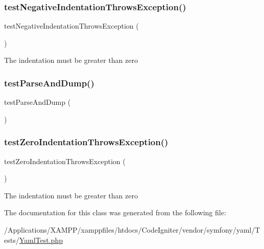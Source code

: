 \subsubsection{\texorpdfstring{test\+Negative\+Indentation\+Throws\+Exception()}{testNegativeIndentationThrowsException()}}
{\footnotesize\ttfamily test\+Negative\+Indentation\+Throws\+Exception (\begin{DoxyParamCaption}{ }\end{DoxyParamCaption})}

The indentation must be greater than zero \mbox{\label{class_symfony_1_1_component_1_1_yaml_1_1_tests_1_1_yaml_test_aa4b0f9bbd68ce5dfd5762103d00c7e23}} 
\subsubsection{\texorpdfstring{test\+Parse\+And\+Dump()}{testParseAndDump()}}
{\footnotesize\ttfamily test\+Parse\+And\+Dump (\begin{DoxyParamCaption}{ }\end{DoxyParamCaption})}

\mbox{\label{class_symfony_1_1_component_1_1_yaml_1_1_tests_1_1_yaml_test_abd2a07951f38494a1fe3e2374ffd04de}} 
\subsubsection{\texorpdfstring{test\+Zero\+Indentation\+Throws\+Exception()}{testZeroIndentationThrowsException()}}
{\footnotesize\ttfamily test\+Zero\+Indentation\+Throws\+Exception (\begin{DoxyParamCaption}{ }\end{DoxyParamCaption})}

The indentation must be greater than zero 

The documentation for this class was generated from the following file\+:\begin{DoxyCompactItemize}
\item 
/\+Applications/\+X\+A\+M\+P\+P/xamppfiles/htdocs/\+Code\+Igniter/vendor/symfony/yaml/\+Tests/\mbox{\hyperlink{_yaml_test_8php}{Yaml\+Test.\+php}}\end{DoxyCompactItemize}
